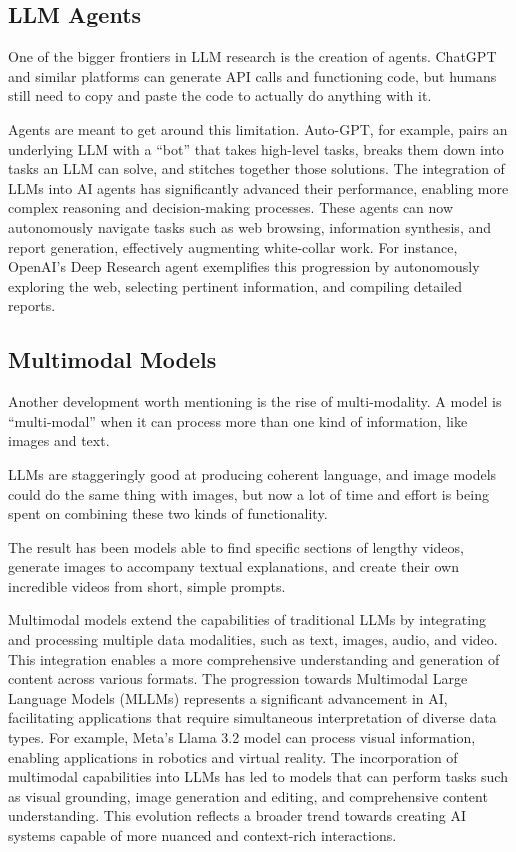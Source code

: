 \subsection{LLM Agents}

One of the bigger frontiers in LLM research is the creation of agents. ChatGPT and similar platforms can generate API calls and functioning code, but humans still need to copy and paste the code to actually do anything with it.

Agents are meant to get around this limitation. Auto-GPT, for example, pairs an underlying LLM with a “bot” that takes high-level tasks, breaks them down into tasks an LLM can solve, and stitches together those solutions. The integration of LLMs into AI agents has significantly advanced their performance, enabling more complex reasoning and decision-making processes. These agents can now autonomously navigate tasks such as web browsing, information synthesis, and report generation, effectively augmenting white-collar work. For instance, OpenAI's Deep Research agent exemplifies this progression by autonomously exploring the web, selecting pertinent information, and compiling detailed reports.

\subsection{Multimodal Models}

Another development worth mentioning is the rise of multi-modality. A model is “multi-modal” when it can process more than one kind of information, like images and text.

LLMs are staggeringly good at producing coherent language, and image models could do the same thing with images, but now a lot of time and effort is being spent on combining these two kinds of functionality.

The result has been models able to find specific sections of lengthy videos, generate images to accompany textual explanations, and create their own incredible videos from short, simple prompts.

Multimodal models extend the capabilities of traditional LLMs by integrating and processing multiple data modalities, such as text, images, audio, and video. This integration enables a more comprehensive understanding and generation of content across various formats. The progression towards Multimodal Large Language Models (MLLMs) represents a significant advancement in AI, facilitating applications that require simultaneous interpretation of diverse data types. For example, Meta's Llama 3.2 model can process visual information, enabling applications in robotics and virtual reality. 
The incorporation of multimodal capabilities into LLMs has led to models that can perform tasks such as visual grounding, image generation and editing, and comprehensive content understanding. This evolution reflects a broader trend towards creating AI systems capable of more nuanced and context-rich interactions. 

